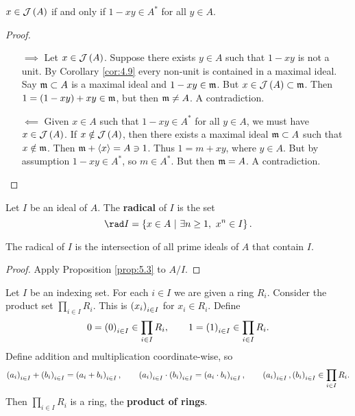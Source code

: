 \begin{proposition}
$ x \in \JJJ\br{A} $ if and only if $ 1 - xy \in A^* $ for all $ y \in A $.
\end{proposition}

\begin{proof}
\hfill
\begin{itemize}
\item[$ \implies $] Let $ x \in \JJJ\br{A} $. Suppose there exists $ y \in A $ such that $ 1 - xy $ is not a unit. By Corollary \ref{cor:4.9} every non-unit is contained in a maximal ideal. Say $ \mathfrak{m} \subset A $ is a maximal ideal and $ 1 - xy \in \mathfrak{m} $. But $ x \in \JJJ\br{A} \subset \mmm $. Then $ 1 = \br{1 - xy} + xy \in \mmm $, but then $ \mathfrak{m} \ne A $. A contradiction.
\item[$ \impliedby $] Given $ x \in A $ such that $ 1 - xy \in A^* $ for all $ y \in A $, we must have $ x \in \JJJ\br{A} $. If $ x \notin \JJJ\br{A} $, then there exists a maximal ideal $ \mathfrak{m} \subset A $ such that $ x \notin \mathfrak{m} $. Then $ \mathfrak{m} + \left\langle x \right\rangle = A \ni 1 $. Thus $ 1 = m + xy $, where $ y \in A $. But by assumption $ 1 - xy \in A^* $, so $ m \in A^* $. But then $ \mathfrak{m} = A $. A contradiction.
\end{itemize}
\end{proof}

Let $ I $ be an ideal of $ A $. The \textbf{radical} of $ I $ is the set
$$ \rad I = \cbr{x \in A \st \exists n \ge 1, \ x^n \in I}. $$

\begin{proposition}
The radical of $ I $ is the intersection of all prime ideals of $ A $ that contain $ I $.
\end{proposition}

\begin{proof}
Apply Proposition \ref{prop:5.3} to $ A / I $.
\end{proof}


\begin{definition}
Let $ I $ be an indexing set. For each $ i \in I $ we are given a ring $ R_i $. Consider the product set $ \prod_{i \in I} R_i $. This is $ \br{x_i}_{i \in I} $ for $ x_i \in R_i $. Define
$$ 0 = \br{0}_{i \in I} \in \prod_{i \in I} R_i, \qquad 1 = \br{1}_{i \in I} \in \prod_{i \in I} R_i. $$
Define addition and multiplication coordinate-wise, so
$$ \br{a_i}_{i \in I} + \br{b_i}_{i \in I} = \br{a_i + b_i}_{i \in I}, \qquad \br{a_i}_{i \in I} \cdot \br{b_i}_{i \in I} = \br{a_i \cdot b_i}_{i \in I}, \qquad \br{a_i}_{i \in I}, \br{b_i}_{i \in I} \in \prod_{i \in I} R_i. $$
Then $ \prod_{i \in I} R_i $ is a ring, the \textbf{product of rings}.
\end{definition}

